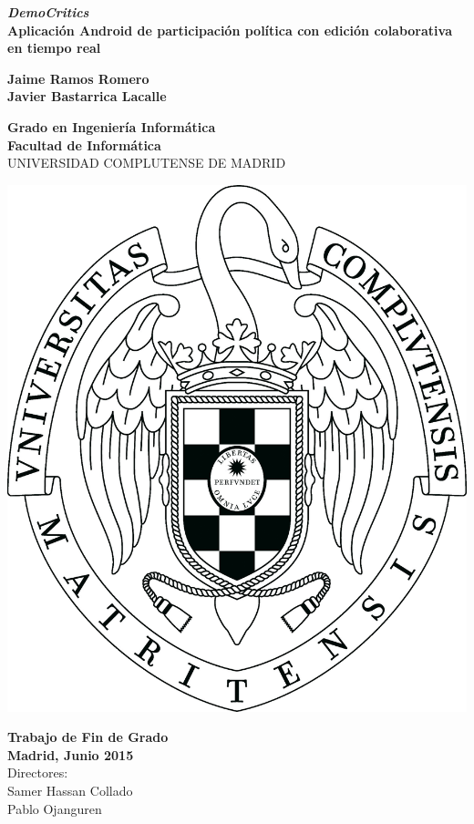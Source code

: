 \setcounter{page}{1}

\newpage
\thispagestyle{cover}
\begin{center}
  {\Huge \bf \textit{DemoCritics}} \\
  \vspace*{0.5cm}
  {\large \bf Aplicación Android de participación política con edición colaborativa en tiempo real}

  \vfill
  {\LARGE\bf Jaime Ramos Romero\\
    \vspace*{0.5cm}
	     Javier Bastarrica Lacalle}

  \vfill

  {\Large\bf Grado en Ingeniería Informática\\}
  {\Large\bf Facultad de Informática\\}
  \vspace*{0.4cm}
  {UNIVERSIDAD COMPLUTENSE DE MADRID}
  \vspace*{0.8cm}
  
   \begin{center}
   \includegraphics[keepaspectratio, scale=0.12]{Media/ucmlogo.png}
   \end{center}
  
  \vspace*{0.5cm}

  {\large\bf Trabajo de Fin de Grado\\
             Madrid, Junio 2015\\}
  \vspace*{0.7cm}
  {\large Directores:\\
          Samer Hassan Collado\\
          Pablo Ojanguren}
  \vfill

  \rhead{}
  \rfoot{}
  \fancyhf{}

\end{center}
